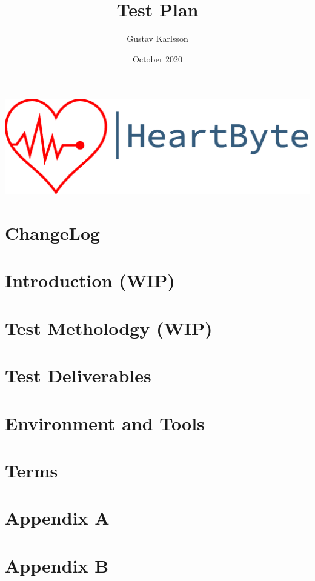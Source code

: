\documentclass{article}
\title{Test Plan}
\author{Gustav Karlsson }
\date{October 2020}
\begin{document}
\maketitle
\vfill
\includegraphics[width=\linewidth]{Pictures/logo_heartbyte_transparent_v_1_1 (1)}

    \vfill
\clearpage


\section*{ChangeLog}


\clearpage
\section{Introduction (WIP)}


\section{Test Metholodgy (WIP)}


\section{Test Deliverables}
\section{Environment and Tools}

\section{Terms}

\section*{Appendix A}

\section*{Appendix B}
\end{document}
